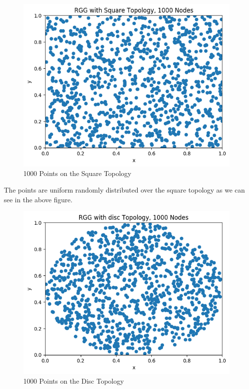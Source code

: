 \documentclass{article}
\begin{document}
    \begin{figure}[H]

      \includegraphics[width=1 \textwidth]{square/drawing/nodes.png}
      \caption{1000 Points on the Square Topology}
    \end{figure}
    The points are uniform randomly distributed over the square topology as we can see in the above figure.
    \begin{figure}[H]

      \includegraphics[width=1 \textwidth]{disc/drawing/nodes.png}
      \caption{1000 Points on the Disc Topology}
    \end{figure}
\end{document}

